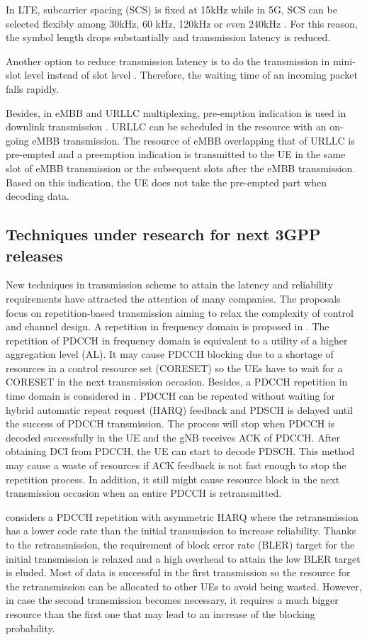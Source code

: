 \documentclass[conference]{IEEEtran}
\begin{document}
In LTE, subcarrier spacing (SCS) is fixed at 15kHz while in 5G, SCS can be selected flexibly among 30kHz, 60 kHz, 120kHz or even 240kHz \cite{ad2}. For this reason, the symbol length drops substantially and transmission latency is reduced.

Another option to reduce transmission latency is to do the transmission in mini-slot level instead of slot level \cite{ad3}. Therefore, the waiting time of an incoming packet falls rapidly.

Besides, in eMBB and URLLC multiplexing, pre-emption indication is used in downlink transmission \cite{ad4}. URLLC can be scheduled in the resource with an on-going eMBB transmission. The resource of eMBB overlapping that of URLLC is pre-empted and a preemption indication is transmitted to the UE in the same slot of eMBB transmission or the subsequent slots after the eMBB transmission. Based on this indication, the UE does not take the pre-empted part when decoding data.

\subsection{Techniques under research for next 3GPP releases}\label{IBB}
New techniques in transmission scheme to attain the latency and reliability requirements have attracted the attention of many companies. The proposals focus on repetition-based transmission aiming to relax the complexity of control and channel design. A repetition in frequency domain is proposed in \cite{b1}. The repetition of PDCCH in frequency domain is equivalent to a utility of a higher aggregation level (AL). It may cause PDCCH blocking due to a shortage of resources in a control resource set (CORESET) so the UEs have to wait for a CORESET in the next transmission occasion. Besides, a PDCCH repetition in time domain is considered in \cite{b2}. PDCCH can be repeated without waiting for hybrid automatic repeat request (HARQ) feedback and PDSCH is delayed until the success of PDCCH transmission. The process will stop when PDCCH is decoded successfully in the UE and the gNB receives ACK of PDCCH. After obtaining DCI from PDCCH, the UE can start to decode PDSCH. This method may cause a waste of resources if ACK feedback is not fast enough to stop the repetition process. In addition, it still might cause resource block in the next transmission occasion when an entire PDCCH is retransmitted.  

\cite{b3} considers a PDCCH repetition with asymmetric HARQ where the retransmission has a lower code rate than the initial transmission to increase reliability. Thanks to the retransmission, the requirement of block error rate (BLER) target for the initial transmission is relaxed and a high overhead to attain the low BLER target is eluded. Most of data is successful in the first transmission so the resource for the retransmission can be allocated to other UEs to avoid being wasted. However, in case the second transmission becomes necessary, it requires a much bigger resource than the first one that may lead to an increase of the blocking probability.
\end{document}
